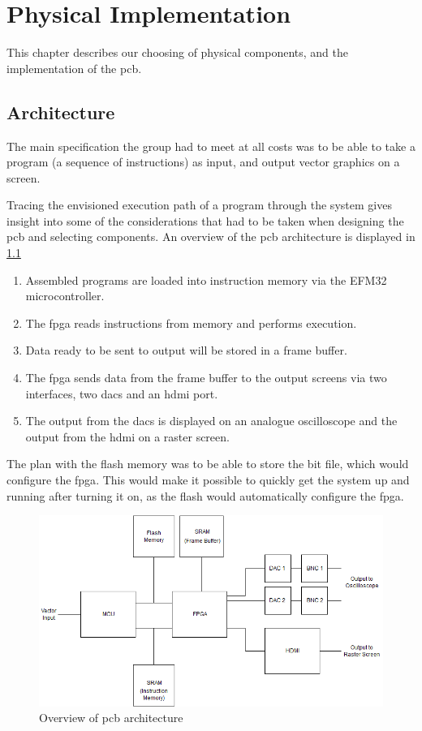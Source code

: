 \chapter{Physical Implementation}

This chapter describes our choosing of physical components, and the implementation of the \gls{pcb}.

\section{Architecture}
The main specification the group had to meet at all costs was to be able to take a program (a sequence of instructions) as input, and output vector graphics on a screen.

Tracing the envisioned execution path of a program through the system gives insight into some of the considerations that had to be taken when designing the \gls{pcb} and selecting components. An overview of the \gls{pcb} architecture is displayed in \ref{fig:PCB_Overview}

\begin{enumerate}
\item Assembled \vthreek programs are loaded into instruction memory via the EFM32 microcontroller.
\item The \gls{fpga} reads instructions from memory and performs execution.
\item Data ready to be sent to output will be stored in a frame buffer.
\item The \gls{fpga} sends data from the frame buffer to the output screens via two interfaces, two \gls{dac}s and an \gls{hdmi} port.
\item The output from the \gls{dac}s is displayed on an analogue oscilloscope and the output from the \gls{hdmi} on a raster screen.
\end{enumerate}

The plan with the flash memory was to be able to store the bit file, which would configure the \gls{fpga}.
This would make it possible to quickly get the system up and running after turning it on, as the flash would automatically configure the \gls{fpga}.

\begin{figure}[h!]
\centering
\includegraphics[scale = 0.56]{images/PCB_Overview.png}
\caption{Overview of \gls{pcb} architecture}
\label{fig:PCB_Overview}
\end{figure}

